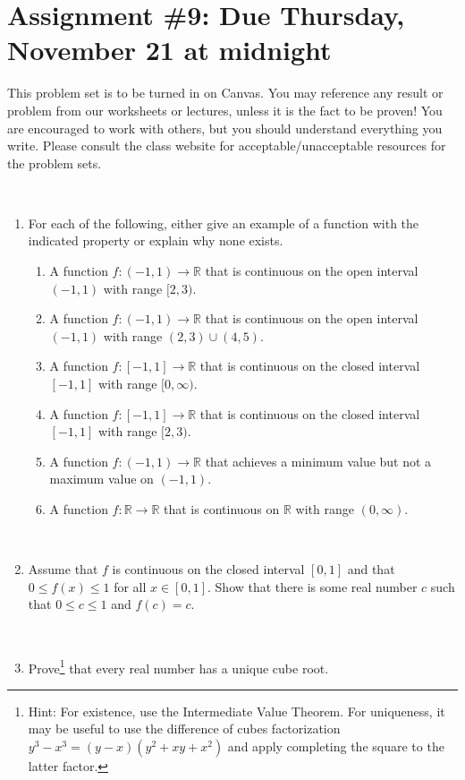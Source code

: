 \documentclass[12pt]{amsart}
\newcommand{\R}{\mathbb{R}}
\newcommand{\showsol}[1]{\def\displaysol{#1}}
\begin{document}
\showsol{1}
	
	\thispagestyle{empty}
	
	\section*{Assignment \#9: Due Thursday, November 21 at midnight}
	
	This problem set is to be turned in on Canvas. You may reference any result or problem from our worksheets or lectures, unless it is the fact to be proven! You are encouraged to work with others, but you should understand everything you write. Please consult the class website for acceptable/unacceptable resources for the problem sets.
	
	\
	

\begin{enumerate}


\item For each of the following, either give an example of a function with the indicated property or explain why none exists.
\begin{enumerate}
\item A function $f:(-1,1)\to \R$ that is continuous on the open interval $(-1,1)$  with range $[2,3)$.
\item A function $f:(-1,1)\to \R$ that is continuous on the open interval $(-1,1)$ with range ${(2,3) \cup (4,5)}$.
\item A function $f:[-1,1]\to \R$ that is continuous on the closed interval $[-1,1]$ with range $[0,\infty)$.
\item A function $f:[-1,1]\to \R$ that is continuous on the closed interval $[-1,1]$ with range $[2,3)$.
\item A function $f:(-1,1)\to \R$ that achieves a minimum value but not a maximum value on $(-1,1)$.
\item A function $f:\R\to \R$ that is continuous on $\R$ with range $(0,\infty)$.
\end{enumerate}

\

\item Assume that $f$ is continuous on the closed interval $[0,1]$ and that $0\leq f(x) \leq 1$ for all $x\in [0,1]$. Show that there is some real number $c$ such that $0\leq c \leq 1$ and $f(c)=c$.

\


\item Prove\footnote{Hint: For existence, use the Intermediate Value Theorem. For uniqueness, it may be useful to use the difference of cubes factorization $y^3 - x^3  = (y-x)(y^2+xy+x^2)$ and apply completing the square to the latter factor.}  that every real number has a unique cube root.
\end{enumerate}
\end{document}
